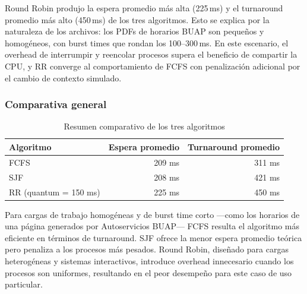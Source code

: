 Round Robin produjo la espera promedio más alta (225\,ms) y el turnaround promedio
más alto (450\,ms) de los tres algoritmos. Esto se explica por la naturaleza de
los archivos: los PDFs de horarios BUAP son pequeños y homogéneos, con burst times
que rondan los 100--300\,ms. En este escenario, el overhead de interrumpir y
reencolar procesos supera el beneficio de compartir la CPU, y RR converge al
comportamiento de FCFS con penalización adicional por el cambio de contexto simulado.

\subsubsection*{Comparativa general}

\begin{table}[H]
\centering
\caption{Resumen comparativo de los tres algoritmos}
\label{tab:comparativa-algoritmos}
\begin{tabular}{|l|r|r|}
\hline
\textbf{Algoritmo} & \textbf{Espera promedio} & \textbf{Turnaround promedio} \\
\hline
FCFS                        & 209 ms & 311 ms \\
SJF                         & 208 ms & 421 ms \\
RR (quantum = 150 ms)       & 225 ms & 450 ms \\
\hline
\end{tabular}
\end{table}

Para cargas de trabajo homogéneas y de burst time corto —como los horarios de una
página generados por Autoservicios BUAP— FCFS resulta el algoritmo más eficiente
en términos de turnaround. SJF ofrece la menor espera promedio teórica pero penaliza
a los procesos más pesados. Round Robin, diseñado para cargas heterogéneas y sistemas
interactivos, introduce overhead innecesario cuando los procesos son uniformes,
resultando en el peor desempeño para este caso de uso particular.
